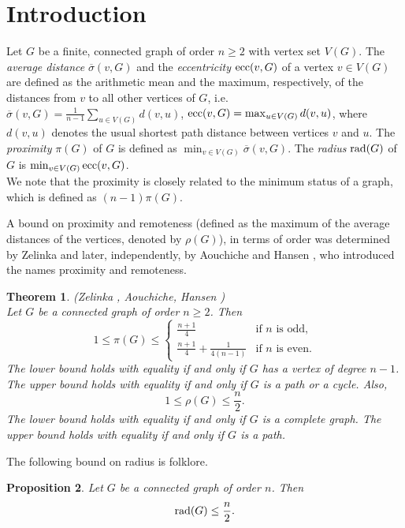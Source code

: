 \documentclass[a4paper,11pt]{article}
\newtheorem{theorem}{Theorem}[section]
\newtheorem{proposition}[theorem]%
{Proposition}
\numberwithin{equation}{theorem}
\begin{document}
\section{Introduction}
Let $G$ be a finite, connected graph of order $n \geq 2$ with vertex set $V(G)$. 
The \textit{average distance} $\overline{\sigma}(v, G)$ and the \textit{eccentricity} 
${\rm ecc}(v,G)$ of a vertex $v\in V(G)$ are defined as the arithmetic mean and the maximum, 
respectively,  of the distances from $v$ to all other vertices of $G$, i.e.
$\overline{\sigma}(v, G)=\frac{1}{n-1} \sum_{u \in V(G)} d(v,u)$,
${\rm ecc}(v, G)=\max_{u \in V(G)} d(v,u)$,
where $d(v,u)$ denotes the usual shortest path distance between vertices $v$ and $u$.  
The {\em proximity} $\pi(G)$ of $G$ is defined as $\min_{v\in V(G)} \overline{\sigma}(v,G)$.  
The \textit{radius} ${\rm rad}(G)$ of  $G$ is $\min_{v\in V(G)} {\rm ecc}(v,G)$.\\
We note that the proximity is closely related to the minimum status of a graph, which is defined
as $(n-1)\pi(G)$. 



A bound on proximity and remoteness (defined as the maximum of the average distances of the 
vertices, denoted by $\rho(G)$), in terms of order was determined by Zelinka \cite{Zel1968} and later, independently, by Aouchiche and Hansen \cite{AouHan2011}, who
introduced the names proximity and remoteness.  

\begin{theorem}
{\rm (Zelinka \cite{Zel1968}, Aouchiche, Hansen \cite{AouHan2011})} \\
\label{theo:bounds-on-proximity-given-order}
Let $G$ be a connected graph of order $n\geq 2$. Then
\[ 1\leq\pi(G) \leq  \left\{ \begin{array}{cc}
\frac{n+1}{4} & \textrm{if $n$ is odd,} \\
\frac{n+1}{4} + \frac{1}{4(n-1)} & \textrm{if $n$ is even.} 
\end{array} \right. \]
The lower bound holds with equality if and only if $G$ has a vertex of degree $n-1$. The upper bound holds with equality if and only if $G$ is a path or a cycle. Also,
\[ 1\leq\rho(G) \leq \frac{n}{2}. \]
The lower bound holds with equality if and only if $G$ is a complete graph. The upper bound holds with equality if and only if $G$ is a path.
\end{theorem}

The following bound on radius is folklore. 

\begin{proposition} \label{prop:bound-on-radius-given-order}
Let $G$ be a connected graph of order $n$. Then 
\[ {\rm rad}(G) \leq \frac{n}{2}. \]
\end{proposition}
\end{document}
